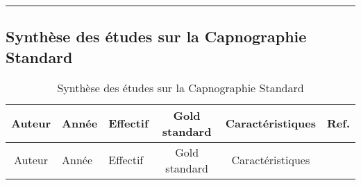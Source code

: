 \documentclass[12pt,]{article}
\begin{document}
\newpage
\begin{landscape}

\begin{center}\rule{0.5\linewidth}{\linethickness}\end{center}

\hypertarget{synthese-des-etudes-sur-la-capnographie-standard-2}{%
\subsection{Synthèse des études sur la Capnographie
Standard}\label{synthese-des-etudes-sur-la-capnographie-standard-2}}

\begin{longtable}[]{@{}cllccl@{}}
\caption{Synthèse des études sur la Capnographie
Standard}\tabularnewline
\toprule
\begin{minipage}[b]{0.09\columnwidth}\centering
Auteur\strut
\end{minipage} & \begin{minipage}[b]{0.05\columnwidth}\raggedright
Année\strut
\end{minipage} & \begin{minipage}[b]{0.08\columnwidth}\raggedright
Effectif\strut
\end{minipage} & \begin{minipage}[b]{0.14\columnwidth}\centering
Gold standard\strut
\end{minipage} & \begin{minipage}[b]{0.40\columnwidth}\centering
Caractéristiques\strut
\end{minipage} & \begin{minipage}[b]{0.08\columnwidth}\raggedright
Ref.\strut
\end{minipage}\tabularnewline
\midrule
\endfirsthead
\toprule
\begin{minipage}[b]{0.09\columnwidth}\centering
Auteur\strut
\end{minipage} & \begin{minipage}[b]{0.05\columnwidth}\raggedright
Année\strut
\end{minipage} & \begin{minipage}[b]{0.08\columnwidth}\raggedright
Effectif\strut
\end{minipage} & \begin{minipage}[b]{0.14\columnwidth}\centering
Gold standard\strut
\end{minipage} & \begin{minipage}[b]{0.40\columnwidth}\centering
Caractéristiques\strut

\end{minipage}
\end{longtable}
\end{landscape}
\end{document}
